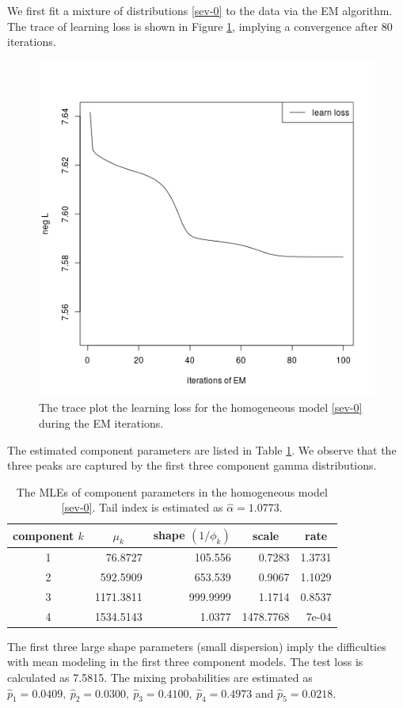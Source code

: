 \documentclass[11pt]{article}
\numberwithin{equation}{section}
\begin{document}
We first fit a mixture of distributions \eqref{sev-0} to the data via the EM algorithm. 
The trace of learning loss is shown in Figure \ref{null_sev}, implying a convergence after 80 iterations.
	\begin{figure}[h!]
		\centering
		\includegraphics[width=0.4\linewidth]{../plots/sev/null_trace}
		\caption{The trace plot the learning loss for the homogeneous model \eqref{sev-0} during the EM iterations.}\label{null_sev}
	\end{figure}
The estimated component parameters are listed in Table \ref{null-gamma}. We observe that the three peaks are captured by the first three component gamma distributions.
	\begin{table}[h!]
		\centering
		\caption{The MLEs of component parameters in the homogeneous model \eqref{sev-0}. Tail index is estimated as $\hat{\alpha}=1.0773$.}\label{null-gamma}
		\begin{tabular}{crrrr}
			\hline
			component $k$ & \multicolumn{1}{c}{$\mu_k$} & \multicolumn{1}{c}{shape $(1/\phi_k)$} & \multicolumn{1}{c}{scale} & \multicolumn{1}{c}{rate} \\ \hline
			1         & 76.8727                & 105.556                   & 0.7283                    & 1.3731                   \\
			2         & 592.5909               & 653.539                   & 0.9067                    & 1.1029                   \\
			3         & 1171.3811              & 999.9999                  & 1.1714                    & 0.8537                   \\
			4         & 1534.5143              & 1.0377                    & 1478.7768                 & 7e-04                    \\ \hline
		\end{tabular}
	\end{table}
	The first three large shape parameters (small dispersion) imply the  difficulties with {mean modeling} in the first three component models.
	 The test loss is calculated as 7.5815. The mixing probabilities are estimated as $\hat{p}_1=0.0409,~ \hat{p}_2=0.0300, ~\hat{p}_3=0.4100,~ \hat{p}_4=0.4973$ and $\hat{p}_5=0.0218.$
\end{document}
